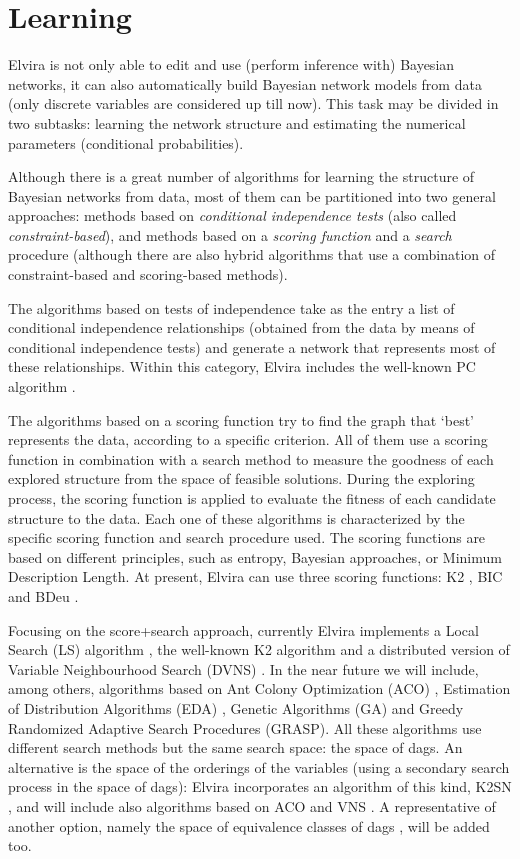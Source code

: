 \section{Learning}
\label{sec:learning}

Elvira is not only able to edit and use (perform inference with) Bayesian networks, it can also automatically build Bayesian network models from data (only discrete variables are considered up till now). This task may be divided in two subtasks: learning the network structure and estimating the numerical parameters (conditional probabilities).
  
Although there is a great number of algorithms for learning the structure of Bayesian networks from data, most of them can be partitioned into two general approaches: methods based on {\it conditional independence tests} (also called {\it constraint-based}), and methods based on a {\it scoring function} and a {\it search} procedure (although there are also hybrid algorithms that use a combination of constraint-based and scoring-based methods).

The algorithms based on tests of independence  take as the entry a list of conditional
independence relationships (obtained from the data by means of conditional independence tests) and generate a network that represents most of these relationships. Within this category, Elvira includes the well-known PC algorithm \cite{Spirtes93}.

The algorithms based on a scoring function try to find the graph that `best' represents the data, according to a specific criterion. All of them  use a scoring function in combination with a search method to measure the goodness of each explored structure from the space of feasible solutions. During the exploring process, the scoring function is applied to evaluate the fitness of each candidate structure to the data. Each one of these algorithms is characterized by the specific scoring function and search procedure used. The scoring functions are based on different principles, such as entropy, Bayesian approaches, or Minimum Description Length. At present, Elvira can use three scoring functions: K2 \cite{CooHersk:k2}, BIC \cite{Schwarz78} and BDeu \cite{heckgeigerchick}. 

Focusing on the score+search approach, currently Elvira implements a Local Search (LS) algorithm \cite{heckgeigerchick}, the well-known K2 algorithm \cite{CooHersk:k2} and a distributed version of Variable Neighbourhood Search (DVNS) \cite{campospuertaISAS01}. In the near future we will include, among others, algorithms based on Ant Colony Optimization (ACO) \cite{ijar02:cfgp}, Estimation of Distribution Algorithms (EDA) \cite{Blanco02}, Genetic Algorithms (GA) \cite{larra:pami} and Greedy Randomized Adaptive Search Procedures (GRASP). All these algorithms use different search methods but the same search space: the space of dags. An alternative is the space of the orderings of the variables (using a secondary search process in the space of dags): Elvira incorporates an algorithm of this kind, K2SN \cite{campospuertaESQ01}, and will include also algorithms based on ACO and VNS \cite{campospuertaESQ01}. A representative of another option, namely the space of equivalence classes of dags \cite{jair02:ac}, will be added too.

